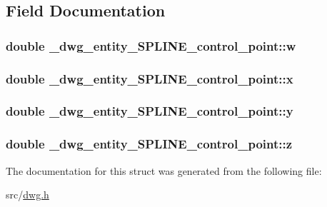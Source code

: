 \subsection{\-Field \-Documentation}
\hypertarget{struct__dwg__entity__SPLINE__control__point_a754c2d0bb50d1ee35e10f3793f408f47}{
\subsubsection[{w}]{\setlength{\rightskip}{0pt plus 5cm}double {\bf \-\_\-dwg\-\_\-entity\-\_\-\-S\-P\-L\-I\-N\-E\-\_\-control\-\_\-point\-::w}}}\label{struct__dwg__entity__SPLINE__control__point_a754c2d0bb50d1ee35e10f3793f408f47}
\hypertarget{struct__dwg__entity__SPLINE__control__point_a8797665eae84bc46bb198238188314a6}{
\subsubsection[{x}]{\setlength{\rightskip}{0pt plus 5cm}double {\bf \-\_\-dwg\-\_\-entity\-\_\-\-S\-P\-L\-I\-N\-E\-\_\-control\-\_\-point\-::x}}}\label{struct__dwg__entity__SPLINE__control__point_a8797665eae84bc46bb198238188314a6}
\hypertarget{struct__dwg__entity__SPLINE__control__point_a85f296460591d8803f19659233d4c2d7}{
\subsubsection[{y}]{\setlength{\rightskip}{0pt plus 5cm}double {\bf \-\_\-dwg\-\_\-entity\-\_\-\-S\-P\-L\-I\-N\-E\-\_\-control\-\_\-point\-::y}}}\label{struct__dwg__entity__SPLINE__control__point_a85f296460591d8803f19659233d4c2d7}
\hypertarget{struct__dwg__entity__SPLINE__control__point_a27e472c2af74fedbc587b371380ac7af}{
\subsubsection[{z}]{\setlength{\rightskip}{0pt plus 5cm}double {\bf \-\_\-dwg\-\_\-entity\-\_\-\-S\-P\-L\-I\-N\-E\-\_\-control\-\_\-point\-::z}}}\label{struct__dwg__entity__SPLINE__control__point_a27e472c2af74fedbc587b371380ac7af}


\-The documentation for this struct was generated from the following file\-:\begin{DoxyCompactItemize}
\item 
src/\hyperlink{dwg_8h}{dwg.\-h}\end{DoxyCompactItemize}
